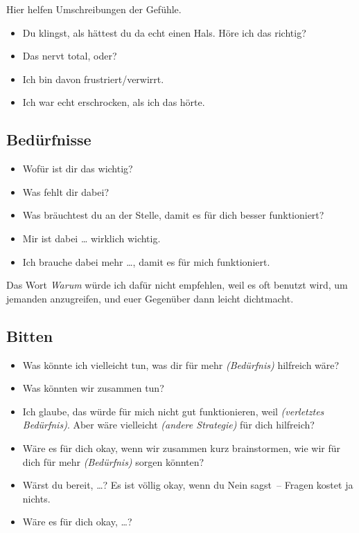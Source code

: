 Hier helfen Umschreibungen der Gefühle.

\begin{itemize}
    \item Du klingst, als hättest du da echt einen Hals. Höre ich das richtig?
    \item Das nervt total, oder?
    \item Ich bin davon frustriert/verwirrt.
    \item Ich war echt erschrocken, als ich das hörte.
\end{itemize}

\subsection{Bedürfnisse}

\begin{itemize}
    \item Wofür ist dir das wichtig?
    \item Was fehlt dir dabei?
    \item Was bräuchtest du an der Stelle, damit es für dich besser funktioniert?
    \item Mir ist dabei \ldots{} wirklich wichtig.
    \item Ich brauche dabei mehr \ldots, damit es für mich funktioniert.
\end{itemize}

Das Wort \emph{Warum} würde ich dafür nicht empfehlen, weil es oft benutzt wird, um jemanden anzugreifen, und euer Gegenüber dann leicht dichtmacht.

\subsection{Bitten}

\begin{itemize}
    \item Was könnte ich vielleicht tun, was dir für mehr \emph{(Bedürfnis)} hilfreich wäre?
    \item Was könnten wir zusammen tun?
    \item Ich glaube, das würde für mich nicht gut funktionieren, weil \emph{(verletztes Bedürfnis)}. Aber wäre vielleicht \emph{(andere Strategie)} für dich hilfreich?
    \item Wäre es für dich okay, wenn wir zusammen kurz brainstormen, wie wir für dich für mehr \emph{(Bedürfnis)} sorgen könnten?
    \item Wärst du bereit, \ldots? Es ist völlig okay, wenn du Nein sagst~-- Fragen kostet ja nichts.
    \item Wäre es für dich okay, \ldots?
\end{itemize}

